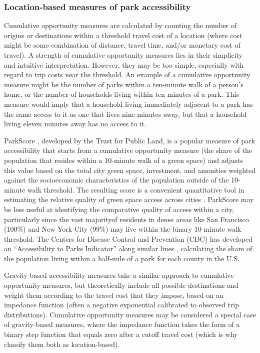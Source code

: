 \documentclass[3p, authoryear, review]{elsarticle} %
\begin{document}
\hypertarget{location-based-measures-of-park-accessibility}{%
\subsubsection{Location-based measures of park accessibility}\label{location-based-measures-of-park-accessibility}}

Cumulative opportunity measures are calculated by counting the number of origins or destinations within a threshold travel cost of a location (where cost might be some combination of distance, travel time, and/or monetary cost of travel). A strength of cumulative opportunity measures lies in their simplicity and intuitive interpretation. However, they may be too simple, especially with regard to trip costs near the threshold. An example of a cumulative opportunity measure might be the number of parks within a ten-minute walk of a person's home, or the number of households living within ten minutes of a park. This measure would imply that a household living immediately adjacent to a park has the same access to it as one that lives nine minutes away, but that a household living eleven minutes away has no access to it.

ParkScore \citep{parkscore2019}, developed by the Trust for Public Land, is a popular measure of park accessibility that starts from a cumulative opportunity measure (the share of the population that resides within a 10-minute walk of a green space) and adjusts this value based on the total city green space, investment, and amenities weighted against the socioeconomic characteristics of the population outside of the 10-minute walk threshold. The resulting score is a convenient quantitative tool in estimating the relative quality of green space access across cities \citep{Rigolon2018}. ParkScore may be less useful at identifying the comparative quality of access within a city, particularly since the vast majorityof residents in dense areas like San Francisco (100\%) and New York City (99\%) may live within the binary 10-minute walk threshold. The Centers for Disease Control and Prevention (CDC) has developed an ``Accessibility to Parks Indicator'' along similar lines \citep{Ussery2016}, calculating the share of the population living within a half-mile of a park for each county in the U.S.

Gravity-based accessibility measures take a similar approach to cumulative opportunity measures, but theoretically include all possible destinations and weight them according to the travel cost that they impose, based on an impedance function (often a negative exponential calibrated to observed trip distributions). Cumulative opportunity measures may be considered a special case of gravity-based measures, where the impedance function takes the form of a binary step function that equals zero after a cutoff travel cost (which is why \citet{GEURS2004127} classify them both as location-based).
\end{document}
